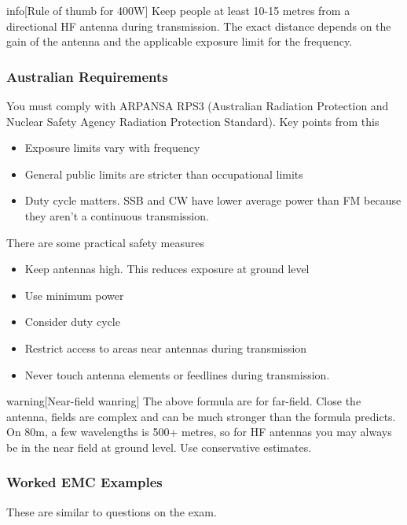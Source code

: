 \documentclass{article}
\begin{document}
\begin{callout}{info}[Rule of thumb for 400W]
    Keep people at least 10-15 metres from a directional HF antenna during transmission. The exact distance depends on the gain of the antenna and the applicable exposure limit for the frequency.
\end{callout}

\subsubsection{Australian Requirements}
You must comply with ARPANSA RPS3 (Australian Radiation Protection and Nuclear Safety Agency Radiation Protection Standard). Key points from this
\begin{itemize}
    \item Exposure limits vary with frequency
    \item General public limits are stricter than occupational limits
    \item Duty cycle matters. SSB and CW have lower average power than FM because they aren't a continuous transmission.
\end{itemize}
There are some practical safety measures
\begin{itemize}
    \item Keep antennas high. This reduces exposure at ground level
    \item Use minimum power
    \item Consider duty cycle
    \item Restrict access to areas near antennas during transmission
    \item Never touch antenna elements or feedlines during transmission.
\end{itemize}

\begin{callout}{warning}[Near-field wanring]
    The above formula are for far-field. Close the antenna, fields are complex and can be much stronger than the formula predicts. On 80m, a few wavelengths is 500+ metres, so for HF antennas you may always be in the near field at ground level. Use conservative estimates.
\end{callout}

\subsubsection{Worked EMC Examples}
These are similar to questions on the exam.
\end{document}
